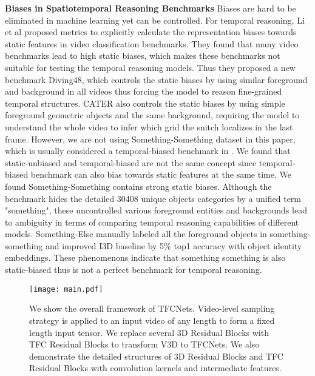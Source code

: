 \documentclass[nohyperref]{article}
\theoremstyle{plain}
\theoremstyle{definition}
\theoremstyle{remark}
\begin{document}
 
 {\bf Biases in Spatiotemporal Reasoning Benchmarks}  Biases are hard to be eliminated in machine learning yet can be controlled. For temporal reasoning, Li et al \cite{Li_2018_ECCV} proposed metrics to explicitly calculate the representation biases towards static features in video classification benchmarks. They found that many video benchmarks \cite{DBLP:conf/cvpr/CarreiraZ17,DBLP:journals/corr/abs-1212-0402} lead to high static biases, which makes these benchmarks not suitable for testing the temporal reasoning models. Thus they proposed a new benchmark Diving48, which controls the static biases by using similar foreground and background in all videos thus forcing the model to reason fine-grained temporal structures. CATER also controls the static biases by using simple foreground geometric objects and the same background, requiring the model to understand the whole video to infer which grid the snitch localizes in the last frame. However, we are not using Something-Something dataset in this paper, which is usually considered a temporal-biased benchmark in \cite{Wang_2021_CVPR,Zhang2020V4D:}. We found that static-unbiased and temporal-biased are not the same concept since temporal-biased benchmark can also bias towards static features at the same time. We found Something-Something\cite{DBLP:conf/iccv/GoyalKMMWKHFYMH17} contains strong static biases. Although the benchmark hides the detailed 30408 unique objects categories by a unified term "something", these uncontrolled various foreground entities and backgrounds lead to ambiguity  in terms of comparing temporal reasoning capabilities of different models. Something-Else\cite{Materzynska_2020_CVPR} manually labeled all the foreground objects in something-something and improved I3D baseline by 5\% top1 accuracy with  object identity embeddings.  These phenomenons indicate that something something is also static-biased thus is not a perfect benchmark for temporal reasoning.\\
\begin{figure*}[t]
  \centering
\texttt{[image: main.pdf]}

   \caption{We show the overall framework of TFCNets. Video-level sampling strategy is applied to an input video of any length to form a fixed length input tensor. We replace several 3D Residual Blocks with TFC Residual Blocks to transform V3D to TFCNets. We also demonstrate the detailed structures of 3D Residual Blocks and TFC Residual Blocks with convolution kernels and intermediate features.
   }
   \label{main}
\end{figure*}
\end{document}
